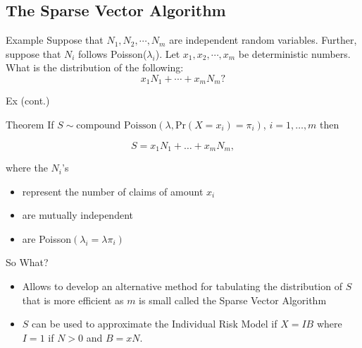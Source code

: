 \documentclass[11pt]{beamer}
\begin{document}
\subsection{The Sparse Vector Algorithm}
\begin{frame}[t]{Example}
Suppose that $N_1, N_2,\cdots, N_m$ are independent random variables. Further, suppose that $N_i$ follows Poisson($\lambda_i$). Let $x_1,x_2,\cdots, x_m$ be deterministic numbers. What is the distribution of the following:
$$x_1N_1+\cdots+x_mN_m?$$
\vfill
\end{frame}
\begin{frame}{Ex (cont.)}

\end{frame}
\begin{frame}{Theorem}
If $S\sim\text{compound Poisson}(\lambda,\mbox{Pr} (X = x_i) =\pi_i)$, $i=1,\ldots,m$ then

\vfill

$$S=x_1N_1+\ldots+x_mN_m,$$

\vfill

where the $N_i$'s
\begin{itemize}
\item represent the number of claims of amount $x_i$
\item are mutually independent
\item are Poisson$(\lambda_i=\lambda \pi_i)$
\end{itemize}

\end{frame}
\begin{frame}{So What?}
\begin{itemize}
\item Allows to develop an alternative method for tabulating the distribution of $S$ that is more efficient as $m$ is small called the \alert{Sparse Vector Algorithm}

\vfill

\item $S$ can be used to approximate the Individual Risk Model if $X=IB$ where $I=1$ if $N>0$ and $B=xN$. 
\end{itemize}

\end{frame}
\end{document}
